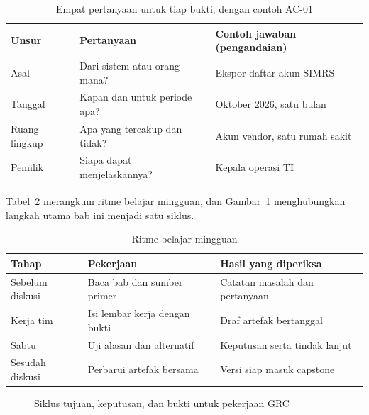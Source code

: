 \begin{table}[!htb]
  \centering\small
  \caption{Empat pertanyaan untuk tiap bukti, dengan contoh AC-01}\label{tab:ch01-bukti}
  \begin{tabularx}{\textwidth}{|>{\raggedright\arraybackslash}p{}|>{\raggedright\arraybackslash}X|>{\raggedright\arraybackslash}X|}
    \hline
    \textbf{Unsur} & \textbf{Pertanyaan} & \textbf{Contoh jawaban (pengandaian)} \\ \hline
    Asal & Dari sistem atau orang mana? & Ekspor daftar akun SIMRS \\ \hline
    Tanggal & Kapan dan untuk periode apa? & Oktober 2026, satu bulan \\ \hline
    Ruang lingkup & Apa yang tercakup dan tidak? & Akun vendor, satu rumah sakit \\ \hline
    Pemilik & Siapa dapat menjelaskannya? & Kepala operasi TI \\ \hline
  \end{tabularx}
\end{table}

Tabel~\ref{tab:ch01-belajar} merangkum ritme belajar mingguan, dan
Gambar~\ref{fig:ch01-alur} menghubungkan langkah utama bab ini menjadi satu siklus.

\begin{table}[!htb]
  \centering\small
  \caption{Ritme belajar mingguan}\label{tab:ch01-belajar}
  \begin{tabularx}{\textwidth}{|>{\raggedright\arraybackslash}p{}|>{\raggedright\arraybackslash}X|>{\raggedright\arraybackslash}X|}
    \hline
    \textbf{Tahap} & \textbf{Pekerjaan} & \textbf{Hasil yang diperiksa} \\ \hline
    Sebelum diskusi & Baca bab dan sumber primer & Catatan masalah dan pertanyaan \\
    \hline
    Kerja tim & Isi lembar kerja dengan bukti & Draf artefak bertanggal \\ \hline
    Sabtu & Uji alasan dan alternatif & Keputusan serta tindak lanjut \\ \hline
    Sesudah diskusi & Perbarui artefak bersama & Versi siap masuk capstone \\ \hline
  \end{tabularx}
\end{table}

\begin{figure}[!htb]
  \centering
  
  \caption{Siklus tujuan, keputusan, dan bukti untuk pekerjaan GRC}\label{fig:ch01-alur}
\end{figure}

